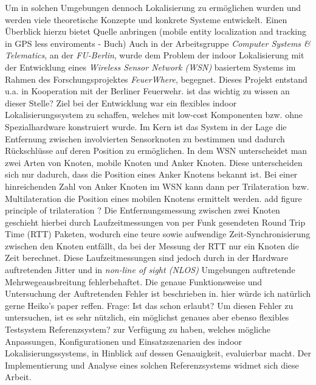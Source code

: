 Um in solchen Umgebungen dennoch Lokalisierung zu ermöglichen wurden und werden viele theoretische Konzepte und 
konkrete Systeme entwickelt. Einen Überblick hierzu bietet
{\color{red}Quelle anbringen (mobile entity localization and tracking in GPS less enviroments - Buch)}
Auch in der Arbeitsgruppe \textit{Computer Systems \& Telematics}, an der \textit{FU-Berlin}, 
wurde dem Problem der indoor Lokalisierung mit der Entwicklung eines \textit{Wireless Sensor Network (WSN)}
basiertem Systems im Rahmen des Forschungsprojektes \textit{FeuerWhere}, begegnet. 
Dieses Projekt entstand u.a. in Kooperation mit der Berliner Feuerwehr.
{\color{red}ist das wichtig zu wissen an dieser Stelle?}
Ziel bei der Entwicklung war ein flexibles indoor Lokalisierungssystem zu schaffen, welches mit
low-cost Komponenten bzw. ohne Spezialhardware konstruiert wurde. 
Im Kern ist das System in der Lage die Entfernung zwischen involvierten Sensorknoten zu bestimmen und 
dadurch Rückschlüsse auf deren Position zu ermöglichen. 
In dem WSN unterscheidet man zwei Arten von Knoten, mobile Knoten und Anker Knoten. 
Diese unterscheiden sich nur dadurch, dass die Position eines Anker Knotens bekannt ist.
Bei einer hinreichenden Zahl von Anker Knoten im WSN kann dann per Trilateration bzw. Multilateration 
die Position eines mobilen Knotens ermittelt werden.
{\color{red} add figure principle of trilateration ?}
Die Entfernungsmessung zwischen zwei Knoten geschieht hierbei durch Laufzeitmessungen von per Funk gesendeten
Round Trip Time (RTT) Paketen, wodurch eine teure sowie aufwendige Zeit-Synchronisierung zwischen den Knoten entfällt,
da bei der Messung der RTT nur ein Knoten die Zeit berechnet.
Diese Laufzeitmessungen sind jedoch durch in der Hardware auftretenden Jitter und 
in \textit{non-line of sight (NLOS)} Umgebungen auftretende Mehrwegeausbreitung fehlerbehaftet. 
Die genaue Funktionsweise und Untersuchung der Auftretenden Fehler ist beschrieben in.
{\color{red} hier würde ich natürlich gerne Heiko's paper reffen. Frage: Ist das schon erlaubt?}
Um diesen Fehler zu untersuchen, ist es sehr nützlich, ein möglichst genaues aber ebenso flexibles Testsystem
{\color{red}Referenzsystem?} zur Verfügung zu haben, welches mögliche Anpassungen, Konfigurationen und 
Einsatzszenarien des indoor Lokalisierungssystems, in Hinblick auf dessen Genauigkeit, evaluierbar macht.
Der Implementierung und Analyse eines solchen Referenzsystems widmet sich diese Arbeit. 


